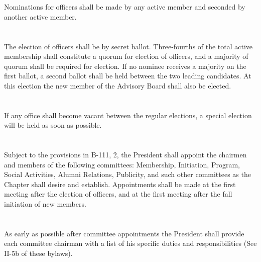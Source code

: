 \documentclass[12pt]{constitution}
\begin{document}
\section{}
Nominations for officers shall be made by any active member and seconded by another active member.
\section{}
The election of officers shall be by secret ballot. Three-fourths of the total active membership shall constitute a quorum for election of officers, and a majority of quorum shall be required for election. If no nominee receives a majority on the first ballot, a second ballot shall be held between the two leading candidates. At this election the new member of the Advisory Board shall also be elected.
\section{}
If any office shall become vacant between the regular elections, a special election will be held as soon as possible. %

\section{}
Subject to the provisions in B-111, 2, the President shall appoint the chairmen and members of the following committees: Membership, Initiation, Program, Social Activities, Alumni Relations, Publicity, and such other committees as the Chapter shall desire and establish. Appointments shall be made at the first meeting after the election of officers, and at the first meeting after the fall initiation of new members. 
\section{}
As early as possible after committee appointments the President shall provide each committee chairman with a list of his specific duties and responsibilities (See II-5b of these bylaws).
\end{document}
